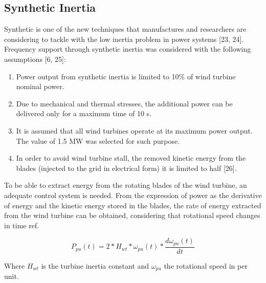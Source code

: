 \subsection{Synthetic Inertia}


Synthetic is one of the new techniques that manufactures and researchers are considering to tackle with the low inertia problem in power systems  [23, 24]. Frequency support through synthetic inertia was considered with the following assumptions [6, 25]:
\begin{enumerate}[leftmargin=*,labelsep=4.9mm]
	\item Power output from synthetic inertia is limited to 10\% of wind turbine nominal power.
	\item Due to mechanical and thermal stresses, the additional power can be delivered only for a maximum time of 10 s.
	\item It is assumed that all wind turbines operate at its maximum power output. The value of 1.5 MW was selected for such purpose.
	\item In order to avoid wind turbine stall, the removed kinetic energy from the blades (injected to the grid in electrical form) it is limited to half [26].

\end{enumerate}

	To be able to extract energy from the rotating blades of the wind turbine, an adequate control system is needed. From the expression of power as the derivative of energy and the kinetic energy stored in the blades, the rate of energy extracted from the wind turbine can be obtained, considering that rotational speed changes in time ref.

\begin{equation}
	\label{eq:si}
	P_{pu}(t)=2*H_{wt}*\omega_{pu}(t)*\dfrac{d\omega_{pu}(t)}{dt}
\end{equation}


Where  $H_{wt}$ is the turbine inertia constant and $\omega_{pu}$ the rotational speed in per unit.\\

